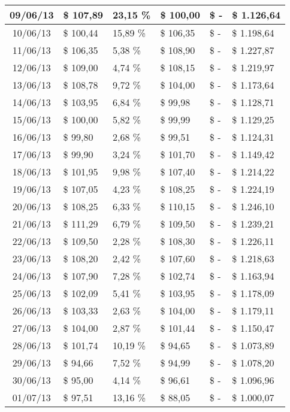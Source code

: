 \begin{small}
\begin{longtable}{|c|l|l|l|l|l|}
09/06/13 & \$ 107,89 & 23,15 \% & \$ 100,00 & \$ - & \$ 1.126,64 \\ \hline
10/06/13 & \$ 100,44 & 15,89 \% & \$ 106,35 & \$ - & \$ 1.198,64 \\ \hline
11/06/13 & \$ 106,35 & 5,38 \% & \$ 108,90 & \$ - & \$ 1.227,87 \\ \hline
12/06/13 & \$ 109,00 & 4,74 \% & \$ 108,15 & \$ - & \$ 1.219,97 \\ \hline
13/06/13 & \$ 108,78 & 9,72 \% & \$ 104,00 & \$ - & \$ 1.173,64 \\ \hline
14/06/13 & \$ 103,95 & 6,84 \% & \$ 99,98 & \$ - & \$ 1.128,71 \\ \hline
15/06/13 & \$ 100,00 & 5,82 \% & \$ 99,99 & \$ - & \$ 1.129,25 \\ \hline
16/06/13 & \$ 99,80 & 2,68 \% & \$ 99,51 & \$ - & \$ 1.124,31 \\ \hline
17/06/13 & \$ 99,90 & 3,24 \% & \$ 101,70 & \$ - & \$ 1.149,42 \\ \hline
18/06/13 & \$ 101,95 & 9,98 \% & \$ 107,40 & \$ - & \$ 1.214,22 \\ \hline
19/06/13 & \$ 107,05 & 4,23 \% & \$ 108,25 & \$ - & \$ 1.224,19 \\ \hline
20/06/13 & \$ 108,25 & 6,33 \% & \$ 110,15 & \$ - & \$ 1.246,10 \\ \hline
21/06/13 & \$ 111,29 & 6,79 \% & \$ 109,50 & \$ - & \$ 1.239,21 \\ \hline
22/06/13 & \$ 109,50 & 2,28 \% & \$ 108,30 & \$ - & \$ 1.226,11 \\ \hline
23/06/13 & \$ 108,20 & 2,42 \% & \$ 107,60 & \$ - & \$ 1.218,63 \\ \hline
24/06/13 & \$ 107,90 & 7,28 \% & \$ 102,74 & \$ - & \$ 1.163,94 \\ \hline
25/06/13 & \$ 102,09 & 5,41 \% & \$ 103,95 & \$ - & \$ 1.178,09 \\ \hline
26/06/13 & \$ 103,33 & 2,63 \% & \$ 104,00 & \$ - & \$ 1.179,11 \\ \hline
27/06/13 & \$ 104,00 & 2,87 \% & \$ 101,44 & \$ - & \$ 1.150,47 \\ \hline
28/06/13 & \$ 101,74 & 10,19 \% & \$ 94,65 & \$ - & \$ 1.073,89 \\ \hline
29/06/13 & \$ 94,66 & 7,52 \% & \$ 94,99 & \$ - & \$ 1.078,20 \\ \hline
30/06/13 & \$ 95,00 & 4,14 \% & \$ 96,61 & \$ - & \$ 1.096,96 \\ \hline
01/07/13 & \$ 97,51 & 13,16 \% & \$ 88,05 & \$ - & \$ 1.000,07 \\ \hline

\end{longtable}
\end{small}
